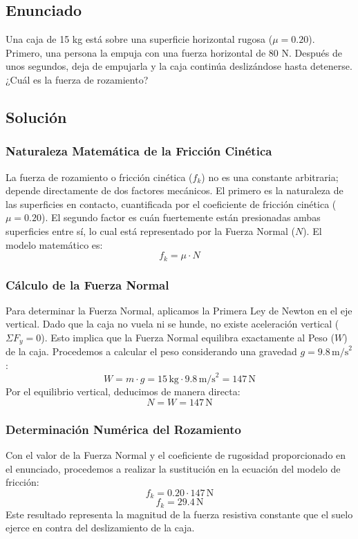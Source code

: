 \documentclass[12pt]{article}
\begin{document}
\subsection*{Enunciado}
Una caja de 15 kg está sobre una superficie horizontal rugosa ($\mu = 0.20$). Primero, una persona la empuja con una fuerza horizontal de 80 N. Después de unos segundos, deja de empujarla y la caja continúa deslizándose hasta detenerse. ¿Cuál es la fuerza de rozamiento?

\subsection*{Solución}

\subsubsection*{Naturaleza Matemática de la Fricción Cinética}
La fuerza de rozamiento o fricción cinética ($f_k$) no es una constante arbitraria; depende directamente de dos factores mecánicos. El primero es la naturaleza de las superficies en contacto, cuantificada por el coeficiente de fricción cinética ($\mu = 0.20$). El segundo factor es cuán fuertemente están presionadas ambas superficies entre sí, lo cual está representado por la Fuerza Normal ($N$). El modelo matemático es:
\begin{equation}
    f_k = \mu \cdot N
\end{equation}

\subsubsection*{Cálculo de la Fuerza Normal}
Para determinar la Fuerza Normal, aplicamos la Primera Ley de Newton en el eje vertical. Dado que la caja no vuela ni se hunde, no existe aceleración vertical ($\Sigma F_y = 0$). Esto implica que la Fuerza Normal equilibra exactamente al Peso ($W$) de la caja. Procedemos a calcular el peso considerando una gravedad $g = 9.8 \, \text{m/s}^2$:
\begin{equation}
    W = m \cdot g = 15 \, \text{kg} \cdot 9.8 \, \text{m/s}^2 = 147 \, \text{N}
\end{equation}
Por el equilibrio vertical, deducimos de manera directa:
\begin{equation}
    N = W = 147 \, \text{N}
\end{equation}

\subsubsection*{Determinación Numérica del Rozamiento}
Con el valor de la Fuerza Normal y el coeficiente de rugosidad proporcionado en el enunciado, procedemos a realizar la sustitución en la ecuación del modelo de fricción:
\begin{equation}
    f_k = 0.20 \cdot 147 \, \text{N}
\end{equation}
\begin{equation}
    f_k = 29.4 \, \text{N}
\end{equation}
Este resultado representa la magnitud de la fuerza resistiva constante que el suelo ejerce en contra del deslizamiento de la caja.
\end{document}
